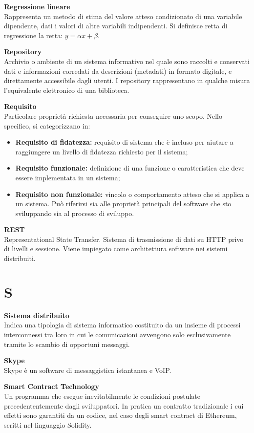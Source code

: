 \documentclass[a4paper, oneside, openany, dvipsnames, table, 12pt]{article}
\begin{document}
\textbf{Regressione lineare} \\
Rappresenta un metodo di stima del valore atteso condizionato di una variabile dipendente, dati i valori di altre variabili indipendenti. Si definisce retta di regressione la retta: $y = \alpha x + \beta $.

\textbf{Repository} \\
Archivio o ambiente di un sistema informativo nel quale sono raccolti e conservati dati e informazioni corredati da descrizioni (metadati) in formato digitale, e direttamente accessibile dagli utenti. I repository
rappresentano in qualche misura l’equivalente elettronico di una biblioteca.

\textbf{Requisito}\\	Particolare proprietà richiesta necessaria per conseguire uno scopo. Nello specifico, si categorizzano in:
\begin{itemize}
	\item \textbf{Requisito di fidatezza:} requisito di sistema che è incluso per aiutare a raggiungere un livello di fidatezza richiesto per il sistema;
	\item \textbf{Requisito funzionale:} definizione di una funzione o caratteristica che deve essere implementata in un sistema;
	\item \textbf{Requisito non funzionale:} vincolo o comportamento atteso che si applica a un sistema. Può riferirsi sia alle proprietà principali del software che sto sviluppando sia al processo di sviluppo.
\end{itemize}

\textbf{REST} \\
Representational State Transfer. Sistema di trasmissione di dati su HTTP privo di livelli e sessione. Viene impiegato come architettura software nei sistemi distribuiti.

\newpage
\section{S}
\textbf{Sistema distribuito} \\
Indica una tipologia di sistema informatico costituito da un insieme di processi interconnessi tra loro in cui le comunicazioni avvengono solo esclusivamente tramite lo scambio di opportuni messaggi.

\textbf{Skype} \\
Skype è un software di messaggistica istantanea e VoIP\glo.

\textbf{Smart Contract Technology} \\
Un programma che esegue inevitabilmente le condizioni postulate precedententemente dagli sviluppatori. In pratica un contratto tradizionale i cui effetti sono garantiti da un codice, nel caso degli smart contract di Ethereum, scritti nel linguaggio Solidity.
\end{document}
